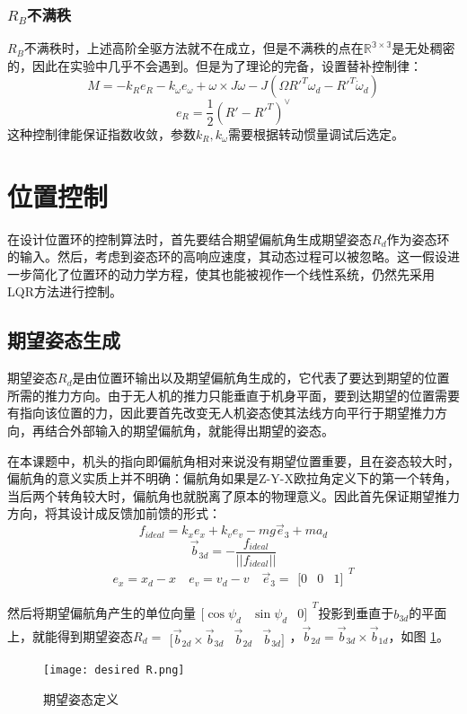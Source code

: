     \subsubsection*{$R_B$不满秩}
    $R_B$不满秩时，上述高阶全驱方法就不在成立，但是不满秩的点在$\mathbb{R^{3 \times 3}}$是无处稠密的，因此在实验中几乎不会遇到。但是为了理论的完备，设置替补控制律\cite{Lee2010}：
    $$M=-k_R e_R-k_\omega e_\omega+\omega \times J \omega -J(\Omega R'^T \omega_d-R'^T \dot \omega_d) $$
    $$ e_R=\frac{1}{2} (R'-R'^T)^\vee $$
    这种控制律能保证指数收敛，参数$k_R,k_\omega$需要根据转动惯量调试后选定。
    \section{位置控制}
    在设计位置环的控制算法时，首先要结合期望偏航角生成期望姿态$R_d$作为姿态环的输入。然后，考虑到姿态环的高响应速度，其动态过程可以被忽略。这一假设进一步简化了位置环的动力学方程，使其也能被视作一个线性系统，仍然先采用LQR方法进行控制。

    
    \subsection{期望姿态生成}
    期望姿态$R_d$是由位置环输出以及期望偏航角生成的，它代表了要达到期望的位置所需的推力方向。由于无人机的推力只能垂直于机身平面，要到达期望的位置需要有指向该位置的力，因此要首先改变无人机姿态使其法线方向平行于期望推力方向，再结合外部输入的期望偏航角，就能得出期望的姿态\cite{Lee2010}。

    在本课题中，机头的指向即偏航角相对来说没有期望位置重要，且在姿态较大时，偏航角的意义实质上并不明确：偏航角如果是Z-Y-X欧拉角定义下的第一个转角，当后两个转角较大时，偏航角也就脱离了原本的物理意义。因此首先保证期望推力方向，将其设计成反馈加前馈的形式：
    $$f_{ideal}=k_x e_x+k_v e_v-mg \vec e_3+m a_d$$
    $$\vec b_{3d}=-\frac{f_{ideal}}{||f_{ideal}||}$$
    $$ e_x=x_d-x \quad e_v=v_d-v \quad \vec e_3=\begin{matrix}
        [0 & 0 & 1]
    \end{matrix}^T$$

    然后将期望偏航角产生的单位向量$\begin{matrix} [\cos{\psi_d} & \sin{\psi_d} & 0]  \end{matrix}^T$投影到垂直于$b_{3d}$的平面上，就能得到期望姿态$R_d= \begin{matrix} [ \vec b_{2d}\times \vec b_{3d} &\vec b_{2d} & \vec b_{3d}] \end{matrix}$，$\vec b_{2d}=\vec b_{3d} \times \vec b_{1d}$，如图 \ref{fig:2}。
    \begin{figure}[!h]
        \centering
        \texttt{[image: desired R.png]}
        \caption{期望姿态定义}
        \label{fig:2}
      \end{figure}

